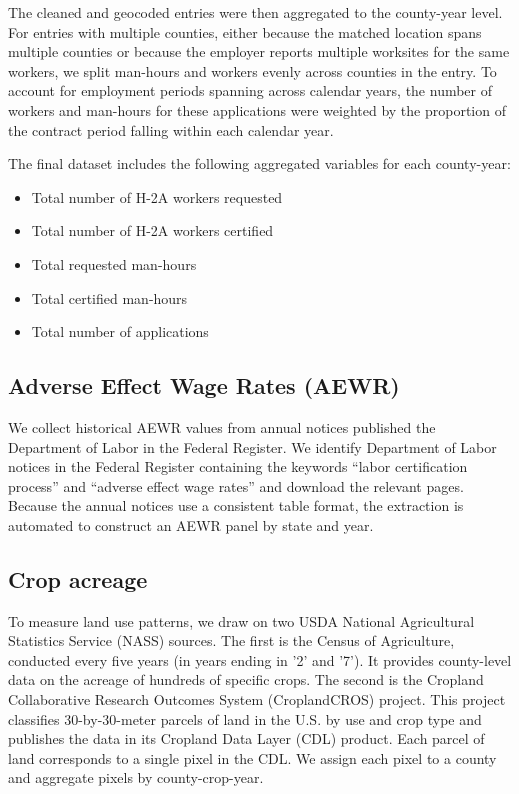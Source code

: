 \documentclass[14pt]{article}
\begin{document}
The cleaned and geocoded entries were then aggregated to the county-year level.
For entries with multiple counties, either because the matched location spans multiple counties or because the employer reports multiple worksites for the same workers, we split man-hours and workers evenly across counties in the entry.
To account for employment periods spanning across calendar years, the number of workers and man-hours for these applications were weighted by the proportion of the contract period falling within each calendar year.

The final dataset includes the following aggregated variables for each county-year:
\begin{itemize}
	\item Total number of H-2A workers requested
	\item Total number of H-2A workers certified
	\item Total requested man-hours
	\item Total certified man-hours
	\item Total number of applications
\end{itemize}

\subsection{Adverse Effect Wage Rates (AEWR)}

We collect historical AEWR values from annual notices published the Department of Labor in the Federal Register.
We identify Department of Labor notices in the Federal Register containing the keywords ``labor certification process'' and ``adverse effect wage rates'' and download the relevant pages.  Because the annual notices use a consistent table format, the extraction is automated to construct an AEWR panel by state and year.

\subsection{Crop acreage}

To measure land use patterns, we draw on two USDA National Agricultural Statistics Service (NASS) sources.
The first is the Census of Agriculture, conducted every five years (in years ending in '2' and '7').
It provides county-level data on the acreage of hundreds of specific crops.
The second is the Cropland Collaborative Research Outcomes System (CroplandCROS) project.
This project classifies 30-by-30-meter parcels of land in the U.S. by use and crop type and publishes the data in its Cropland Data Layer (CDL) product.
Each parcel of land corresponds to a single pixel in the CDL.
We assign each pixel to a county and aggregate pixels by county-crop-year.
\end{document}
